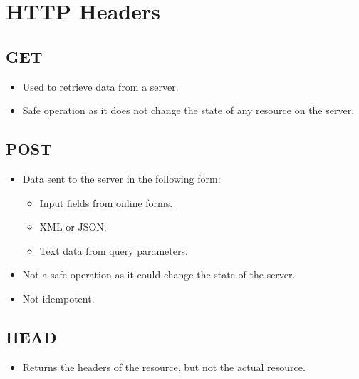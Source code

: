 \chapter*{HTTP Headers} %
\hypertarget{page1}{} %

\section*{GET} %
\begin{itemize}
    \item Used to retrieve data from a server.
    \item Safe operation as it does not change the state of any resource on the server.
\end{itemize}

\vspace{12pt} %

\section*{POST} %
\begin{itemize}
    \item Data sent to the server in the following form: 
    \begin{itemize}
        \item Input fields from online forms.
        \item XML or JSON.
        \item Text data from query parameters.
    \end{itemize}
    \item Not a safe operation as it could change the state of the server.
    \item Not idempotent.
\end{itemize}

\section*{HEAD}
\begin{itemize}
    \item Returns the headers of the resource, but not the actual resource.
\end{itemize}

